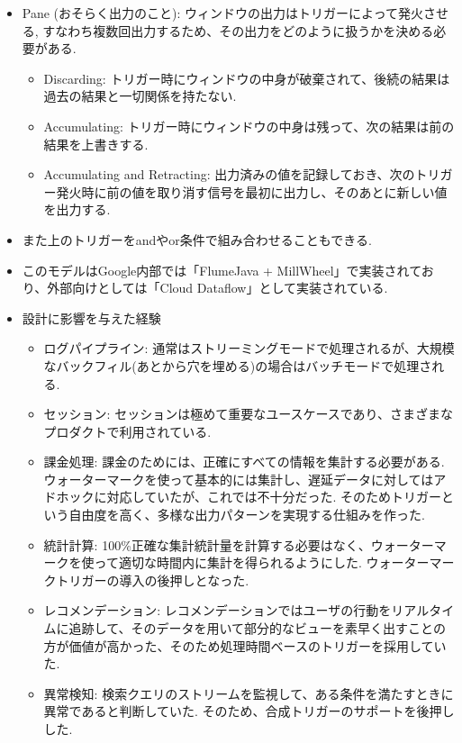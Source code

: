 \documentclass[dvipdfmx,uplatex]{jsarticle}
\theoremstyle{remark}
\newenvironment{method}[1]{
    \begin{tcolorbox}[
        colframe=green!50!black,
        colback=green!50!black!10!white,
        colbacktitle=green!50!black!40!white,
        coltitle=black,
        fonttitle=\bfseries,
        title={#1}
    ]
}{
    \end{tcolorbox}
}
\begin{document}
\begin{method}{Dataflow Model}
\begin{itemize}
\begin{itemize}
    \end{itemize}
    \item Pane (おそらく出力のこと): ウィンドウの出力はトリガーによって発火させる, すなわち複数回出力するため、その出力をどのように扱うかを決める必要がある.
    \begin{itemize}
        \item Discarding: トリガー時にウィンドウの中身が破棄されて、後続の結果は過去の結果と一切関係を持たない.
        \item Accumulating: トリガー時にウィンドウの中身は残って、次の結果は前の結果を上書きする.
        \item Accumulating and Retracting: 出力済みの値を記録しておき、次のトリガー発火時に前の値を取り消す信号を最初に出力し、そのあとに新しい値を出力する.
    \end{itemize}
    \item また上のトリガーをandやor条件で組み合わせることもできる.
\end{itemize}
\end{method}

\begin{method}{Implementation and Design}
\begin{itemize}
    \item このモデルはGoogle内部では「FlumeJava + MillWheel」で実装されており、外部向けとしては「Cloud Dataflow」として実装されている.
    \item 設計に影響を与えた経験
    \begin{itemize}
        \item ログパイプライン: 通常はストリーミングモードで処理されるが、大規模なバックフィル(あとから穴を埋める)の場合はバッチモードで処理される.
        \item セッション: セッションは極めて重要なユースケースであり、さまざまなプロダクトで利用されている.
        \item 課金処理: 課金のためには、正確にすべての情報を集計する必要がある. ウォーターマークを使って基本的には集計し、遅延データに対してはアドホックに対応していたが、これでは不十分だった. そのためトリガーという自由度を高く、多様な出力パターンを実現する仕組みを作った.
        \item 統計計算: 100\%正確な集計統計量を計算する必要はなく、ウォーターマークを使って適切な時間内に集計を得られるようにした. ウォーターマークトリガーの導入の後押しとなった.
        \item レコメンデーション: レコメンデーションではユーザの行動をリアルタイムに追跡して、そのデータを用いて部分的なビューを素早く出すことの方が価値が高かった、そのため処理時間ベースのトリガーを採用していた.
        \item 異常検知: 検索クエリのストリームを監視して、ある条件を満たすときに異常であると判断していた. そのため、合成トリガーのサポートを後押しした.
    \end{itemize}
\end{itemize}
\end{method}
\end{document}
